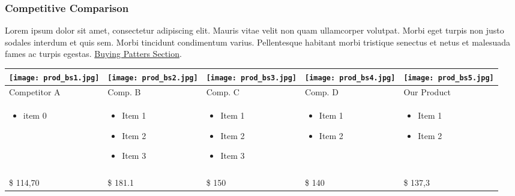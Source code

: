 \documentclass[11pt,titlepage]{article}
\begin{document}
\subsubsection{Competitive Comparison}
Lorem ipsum dolor sit amet, consectetur adipiscing elit. Mauris vitae velit 
non quam ullamcorper volutpat. Morbi eget turpis non justo sodales interdum 
et quis sem. Morbi tincidunt condimentum varius. Pellentesque habitant morbi 
tristique senectus et netus et malesuada fames ac turpis egestas.\newline
\hyperlink{competition_and_buying_patterns}{Buying Patters Section}.\newline\newline
\begin{tabular}{| m{80 pt} | m{80 pt} | m{80 pt} | m{80 pt} | m{80 pt} |}\hline
  \texttt{[image: prod\_bs1.jpg]} & 
  \texttt{[image: prod\_bs2.jpg]} & 
  \texttt{[image: prod\_bs3.jpg]} & 
  \texttt{[image: prod\_bs4.jpg]} & 
  \texttt{[image: prod\_bs5.jpg]} \\ \hline
  Competitor A & Comp. B & Comp. C & Comp. D & Our Product\\ \hline
  \begin{itemize} \tiny \item  item 0\end{itemize} & 
    \begin{itemize} \tiny 
    \item Item 1 
    \item Item 2
    \item Item 3
    \end{itemize} & 
    \begin{itemize} \tiny 
    \item Item 1
    \item Item 2
    \item Item 3 \end{itemize}& 
    \begin{itemize} \tiny 
    \item Item 1
    \item Item 2
    \end{itemize}& 
    \begin{itemize} \tiny 
    \item Item 1
    \item Item 2
    \end{itemize} \\
    & & & &\\ \hline
    \$ 114,70 & \$ 181.1 & \$ 150 & \$ 140 & \$ 137,3\\ \hline
\end{tabular}
\end{document}
